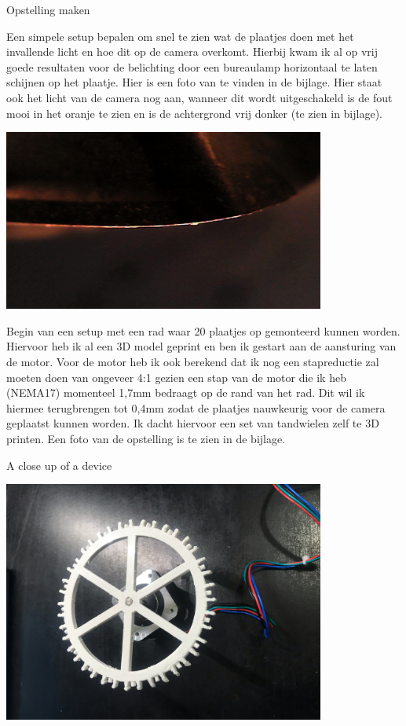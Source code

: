 \documentclass{article}
\begin{document}
Opstelling maken

Een simpele setup bepalen om snel te zien wat de plaatjes doen met het invallende licht en hoe dit op de camera overkomt. Hierbij kwam ik al op vrij goede resultaten voor de belichting door een bureaulamp horizontaal te laten schijnen op het plaatje. Hier is een foto van te vinden in de bijlage. Hier staat ook het licht van de camera nog aan, wanneer dit wordt uitgeschakeld is de fout mooi in het oranje te zien en is de achtergrond vrij donker (te zien in bijlage).






\includegraphics[width=4.166667in, keepaspectratio=true]{./ZimFiles_files/Verslagen/Activiteiten_rapport/Activities/Masterproef_Tool_Wear_Inspection_-_Update_2_DH/eerste-opstelling_donkere_achtergrond3.jpg}




Begin van een setup met een rad waar 20 plaatjes op gemonteerd kunnen worden. Hiervoor heb ik al een 3D model geprint en ben ik gestart aan de aansturing van de motor. Voor de motor heb ik ook berekend dat ik nog een stapreductie zal moeten doen van ongeveer 4:1 gezien een stap van de motor die ik heb (NEMA17) momenteel 1,7mm bedraagt op de rand van het rad. Dit wil ik hiermee terugbrengen tot 0,4mm zodat de plaatjes nauwkeurig voor de camera geplaatst kunnen worden. Ik dacht hiervoor een set van tandwielen zelf te 3D printen. Een foto van de opstelling is te zien in de bijlage.

A close up of a device



\includegraphics[width=4.166667in, keepaspectratio=true]{./ZimFiles_files/Verslagen/Activiteiten_rapport/Activities/Masterproef_Tool_Wear_Inspection_-_Update_2_DH/radhouder_horizontal.jpeg}
\end{document}
